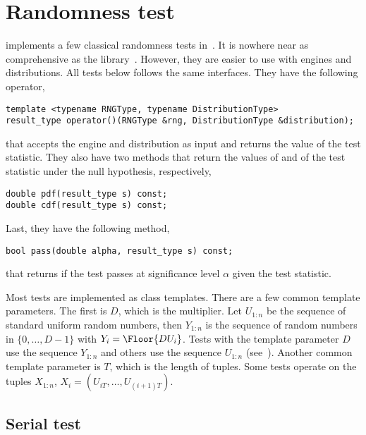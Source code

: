 \section{Randomness test}
\label{sec:Randomness tests}

\mckl implements a few classical randomness tests in~\cite{Knuth:1997us}. It is
nowhere near as comprehensive as the \testu library~\cite{Lecuyer:2007hv}.
However, they are easier to use with \cpp{} \rng engines and distributions. All
tests below follows the same interfaces. They have the following operator,
\begin{Verbatim}
template <typename RNGType, typename DistributionType>
result_type operator()(RNGType &rng, DistributionType &distribution);
\end{Verbatim}
that accepts the \rng engine and distribution as input and returns the value of
the test statistic. They also have two methods that return the values of \pdf
and \cdf of the test statistic under the null hypothesis, respectively,
\begin{Verbatim}
double pdf(result_type s) const;
double cdf(result_type s) const;
\end{Verbatim}
Last, they have the following method,
\begin{Verbatim}
bool pass(double alpha, result_type s) const;
\end{Verbatim}
that returns if the test passes at significance level $\alpha$ given the test
statistic.

Most tests are implemented as class templates. There are a few common template
parameters. The first is $D$, which is the multiplier. Let $U_{1:n}$ be the
sequence of standard uniform random numbers, then $Y_{1:n}$ is the sequence of
random numbers in $\{0,\dots,D - 1\}$ with $Y_i = \Floor{DU_i}$. Tests with the
template parameter $D$ use the sequence $Y_{1:n}$ and others use the sequence
$U_{1:n}$ (see~\cite[pp.~61]{Knuth:1997us}). Another common template parameter
is $T$, which is the length of tuples. Some tests operate on the tuples
$X_{1:n}$, $X_i = (U_{iT},\dots,U_{(i+1)T})$.

\subsection{Serial test}
\label{sub:Serial test}

